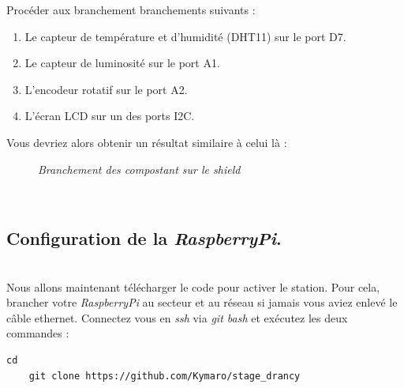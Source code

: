 Procéder aux branchement branchements suivants :
\begin{enumerate}
	\item Le capteur de température et d'humidité (DHT11) sur le port D7.
	\item Le capteur de luminosité sur le port A1.
	\item L'encodeur rotatif sur le port A2.
	\item L'écran LCD sur un des ports I2C.
\end{enumerate}
Vous devriez alors obtenir un résultat similaire à celui là :
	\begin{figure}[H]
	\begin{center}
	\end{center}
		\caption{ \textit{Branchement des compostant sur le shield}}
	\end{figure}\\

\subsection{Configuration de la \textit{RaspberryPi}.}\\

Nous allons maintenant télécharger le code pour activer le station. Pour cela, brancher votre \textit{RaspberryPi} au secteur et au réseau si jamais vous aviez enlevé le câble ethernet. Connectez vous en \textit{ssh} via \textit{git bash} et exécutez les deux commandes :\\
		\begin{lstlisting}[style=MyBashStyle]
	cd
	git clone https://github.com/Kymaro/stage_drancy
		\end{lstlisting}\\

